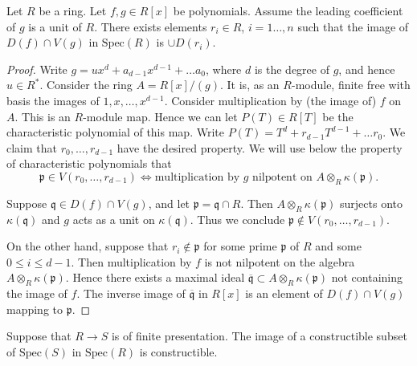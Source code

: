 \begin{lemma}
\label{lemma-affineline-special}
Let $R$ be a ring. Let $f, g \in R[x]$ be polynomials.
Assume the leading coefficient of $g$ is a unit of $R$.
There exists elements $r_i\in R$, $i=1\ldots,n$ such that
the image of $D(f) \cap V(g)$ in $\text{Spec}(R)$ is
$\cup D(r_i)$.
\end{lemma}

\begin{proof}
Write $g = ux^d + a_{d-1}x^{d-1} + \ldots a_0$, where
$d$ is the degree of $g$, and hence $u \in R^*$.
Consider the ring $A = R[x]/(g)$.
It is, as an $R$-module, finite free with basis the images
of $1,x,\ldots,x^{d-1}$. Consider multiplication
by (the image of) $f$ on $A$. This is an $R$-module map.
Hence we can let $P(T) \in R[T]$ be the characteristic polynomial
of this map. Write $P(T) = T^d + r_{d-1} T^{d-1} + \ldots r_0$.
We claim that $r_0, \ldots, r_{d-1}$ have the desired property.
We will use below the property of characteristic polynomials 
that
$$
\mathfrak p \in V(r_0, \ldots, r_{d-1})
\Leftrightarrow
\text{multiplication by }g\text{ nilpotent on }
A\otimes_R \kappa(\mathfrak p).
$$

\medskip\noindent
Suppose $\mathfrak q\in D(f) \cap V(g)$, and let
$\mathfrak p = \mathfrak q \cap R$. Then
$A\otimes_R \kappa(\mathfrak p)$ surjects onto $\kappa(\mathfrak q)$
and $g$ acts as a unit on $\kappa(\mathfrak q)$. 
Thus we conclude $\mathfrak p \not \in  V(r_0, \ldots, r_{d-1})$.

\medskip\noindent
On the other hand, suppose that $r_i \not\in \mathfrak p$ for some
prime $\mathfrak p$ of $R$ and some $0 \leq i \leq d-1$.
Then multiplication by $f$ is not nilpotent on the algebra
$A \otimes_R \kappa(\mathfrak p)$.
Hence there exists a maximal ideal $\overline{\mathfrak q} \subset
A \otimes_R \kappa(\mathfrak p)$ not containing the image of $f$.
The inverse image of $\overline{\mathfrak q}$ in $R[x]$ 
is an element of $D(f) \cap V(g)$ mapping to $\mathfrak p$.
\end{proof}

\begin{theorem}
\label{theorem-chevalley}
Suppose that $R \to S$ is of finite presentation.
The image of a constructible subset of
$\text{Spec}(S)$ in $\text{Spec}(R)$ is constructible.
\end{theorem}


